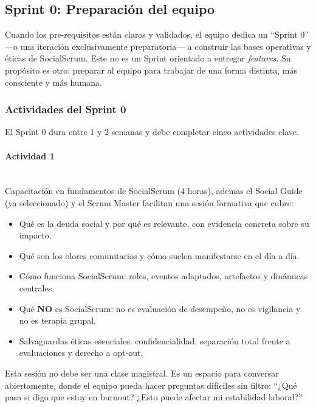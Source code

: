 \subsection{Sprint 0: Preparación del equipo}

Cuando los pre-requisitos están claros y validados, el equipo dedica un “Sprint 0” —o una iteración exclusivamente preparatoria— a construir las bases operativas y éticas de SocialScrum. Este no es un Sprint orientado a entregar \textit{features}. Su propósito es otro: preparar al equipo para trabajar de una forma distinta, más consciente y más humana.

\subsubsection{Actividades del Sprint 0}

El Sprint 0 dura entre 1 y 2 semanas y debe completar cinco actividades clave.

\paragraph{Actividad 1}
\mbox{}\\[-0.1\baselineskip]
Capacitación en fundamentos de SocialScrum (4 horas), ademas el Social Guide (ya seleccionado) y el Scrum Master facilitan una sesión formativa que cubre:

\begin{itemize}
    \item Qué es la deuda social y por qué es relevante, con evidencia concreta sobre su impacto.
    \item Qué son los olores comunitarios y cómo suelen manifestarse en el día a día.
    \item Cómo funciona SocialScrum: roles, eventos adaptados, artefactos y dinámicas centrales.
    \item Qué \textbf{NO} es SocialScrum: no es evaluación de desempeño, no es vigilancia y no es terapia grupal.
    \item Salvaguardas éticas esenciales: confidencialidad, separación total frente a evaluaciones y derecho a opt-out.
\end{itemize}

Esta sesión no debe ser una clase magistral. Es un espacio para conversar abiertamente, donde el equipo pueda hacer preguntas difíciles sin filtro:
``¿Qué pasa si digo que estoy en \gls{burnout}? ¿Esto puede afectar mi estabilidad laboral?''

